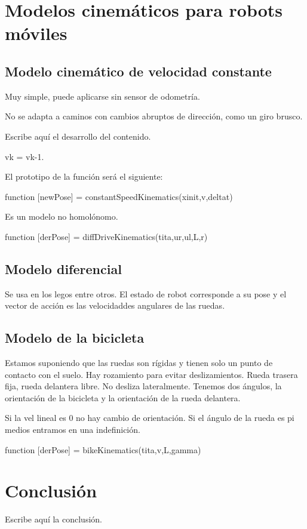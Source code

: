 \documentclass[a4paper]{article}
\begin{document}
\section{Modelos cinemáticos para robots móviles}
\subsection{Modelo cinemático de velocidad constante}
Muy simple, puede aplicarse sin sensor de odometría.

No se adapta a caminos con cambios abruptos de dirección, como un giro brusco.

Escribe aquí el desarrollo del contenido.

vk = vk-1.

El prototipo de la función será el siguiente:

function [newPose] = constantSpeedKinematics(xinit,v,deltat)

Es un modelo no homolónomo.

function [derPose] = diffDriveKinematics(tita,ur,ul,L,r)

\subsection{Modelo diferencial}
Se usa en los legos entre otros.
El estado de robot corresponde a su pose y el vector de acción es las velocidaddes angulares de las ruedas.

\subsection{Modelo de la bicicleta}
Estamos suponiendo que las ruedas son rígidas y tienen solo un punto de contacto con el suelo.
Hay rozamiento para evitar deslizamientos.
Rueda trasera fija, rueda delantera libre.
No desliza lateralmente.
Tenemos dos ángulos, la orientación de la bicicleta y la orientación de la rueda delantera.

Si la vel lineal es 0 no hay cambio de orientación.
Si el ángulo de la rueda es pi medios entramos en una indefinición.

function [derPose] = bikeKinematics(tita,v,L,gamma)

\section{Conclusión}
Escribe aquí la conclusión.
\end{document}
